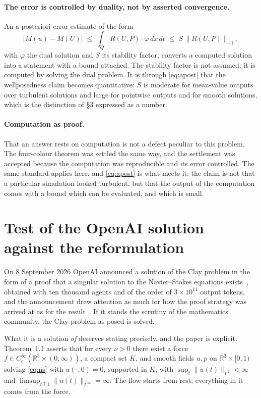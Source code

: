 \documentclass[11pt]{article}
\begin{document}
\paragraph{The error is controlled by duality, not by asserted convergence.} An a posteriori error
estimate of the form
\begin{equation}\label{eq:apost}
|M(u) - M(U)| \;\le\; \int_Q R(U,P)\cdot\varphi\,dx\,dt \;\le\; S\,\|R(U,P)\|_{-1},
\end{equation}
with $\varphi$ the dual solution and $S$ its stability factor, converts a computed solution into a
statement with a bound attached. The stability factor is not assumed; it is computed by solving the
dual problem. It is through \eqref{eq:apost} that the wellposedness claim becomes quantitative: $S$
is moderate for mean-value outputs over turbulent solutions and large for pointwise outputs and for
smooth solutions, which is the distinction of \S3 expressed as a number.

\paragraph{Computation as proof.} That an answer rests on computation is not a defect peculiar to
this problem. The four-colour theorem was settled the same way, and the settlement was accepted
because the computation was reproducible and its error controlled. The same standard applies here,
and \eqref{eq:apost} is what meets it: the claim is not that a particular simulation looked
turbulent, but that the output of the computation comes with a bound which can be evaluated, and
which is small.

\section{Test of the OpenAI solution against the reformulation}\label{sec:ai}

On 8 September 2026 OpenAI announced a solution of the Clay problem in the form of a proof that a
singular solution to the Navier--Stokes equations exists~\cite{openai}, obtained with ten thousand
agents and of the order of $3\times10^{11}$ output tokens, and the announcement drew attention as
much for how the proof strategy was arrived at as for the result~\cite{buckmaster}. If it stands the
scrutiny of the mathematics community, the Clay problem as posed is solved.

What it is a solution \emph{of} deserves stating precisely, and the paper is explicit. Theorem~1.1
asserts that for every $\nu>0$ there exist a force $f\in C^\infty_c(\mathbb{R}^3\times(0,\infty))$, a
compact set $K$, and smooth fields $u,p$ on $\mathbb{R}^3\times[0,1)$ solving \eqref{eq:ns} with
$u(\cdot,0)=0$, supported in $K$, with $\sup_t\|u(t)\|_{L^2}<\infty$ and
$\limsup_{t\uparrow1}\|u(t)\|_{L^\infty}=\infty$. The flow starts from rest; everything in it comes
from the force.
\end{document}
